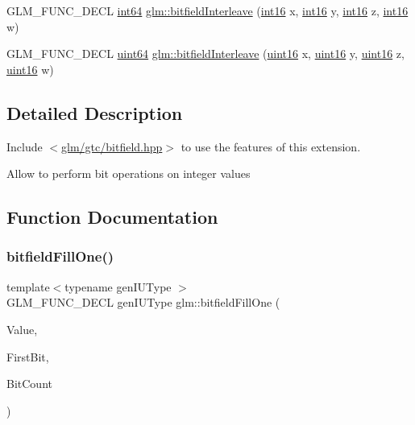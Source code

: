 \begin{DoxyCompactItemize}
\item 
G\+L\+M\+\_\+\+F\+U\+N\+C\+\_\+\+D\+E\+CL \hyperlink{group__gtc__type__precision_ga435d75819cce297cc5fa21bd84ef89a5}{int64} \hyperlink{group__gtc__bitfield_ga09ee0be0fac790a1607a711e597dd9bf}{glm\+::bitfield\+Interleave} (\hyperlink{group__gtc__type__precision_ga2945a61d12771f8954994fcddf02b021}{int16} x, \hyperlink{group__gtc__type__precision_ga2945a61d12771f8954994fcddf02b021}{int16} y, \hyperlink{group__gtc__type__precision_ga2945a61d12771f8954994fcddf02b021}{int16} z, \hyperlink{group__gtc__type__precision_ga2945a61d12771f8954994fcddf02b021}{int16} w)
\item 
G\+L\+M\+\_\+\+F\+U\+N\+C\+\_\+\+D\+E\+CL \hyperlink{group__gtc__type__precision_gae3632bf9b37da66233d78930dd06378a}{uint64} \hyperlink{group__gtc__bitfield_gac8a926a7bfd9b23c22a4f685193fbfe1}{glm\+::bitfield\+Interleave} (\hyperlink{group__gtc__type__precision_gad8c2939e1fdd8e5828b31d95c52255d5}{uint16} x, \hyperlink{group__gtc__type__precision_gad8c2939e1fdd8e5828b31d95c52255d5}{uint16} y, \hyperlink{group__gtc__type__precision_gad8c2939e1fdd8e5828b31d95c52255d5}{uint16} z, \hyperlink{group__gtc__type__precision_gad8c2939e1fdd8e5828b31d95c52255d5}{uint16} w)
\end{DoxyCompactItemize}


\subsection{Detailed Description}
Include $<$\hyperlink{bitfield_8hpp}{glm/gtc/bitfield.\+hpp}$>$ to use the features of this extension.

Allow to perform bit operations on integer values 

\subsection{Function Documentation}
\mbox{\label{group__gtc__bitfield_ga46f9295abe3b5c7658f5b13c7f819f0a}} 
\subsubsection{\texorpdfstring{bitfield\+Fill\+One()}{bitfieldFillOne()}\hspace{0.1cm}{\footnotesize\ttfamily [1/2]}}
{\footnotesize\ttfamily template$<$typename gen\+I\+U\+Type $>$ \\
G\+L\+M\+\_\+\+F\+U\+N\+C\+\_\+\+D\+E\+CL gen\+I\+U\+Type glm\+::bitfield\+Fill\+One (\begin{DoxyParamCaption}\item[{gen\+I\+U\+Type}]{Value,  }\item[{int}]{First\+Bit,  }\item[{int}]{Bit\+Count }\end{DoxyParamCaption})}



